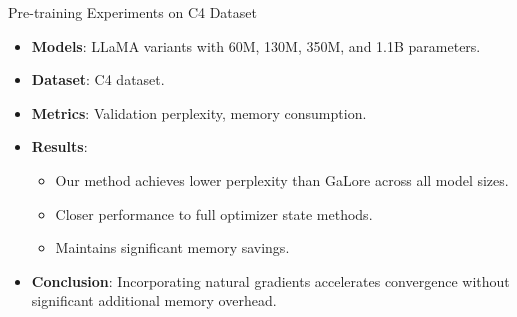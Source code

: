 \documentclass{beamer}
\begin{document}
\begin{frame}{Pre-training Experiments on C4 Dataset}
    \begin{itemize}
        \item \textbf{Models}: LLaMA variants with 60M, 130M, 350M, and 1.1B parameters.
        \item \textbf{Dataset}: C4 dataset.
        \item \textbf{Metrics}: Validation perplexity, memory consumption.
        \item \textbf{Results}:
            \begin{itemize}
                \item Our method achieves lower perplexity than GaLore across all model sizes.
                \item Closer performance to full optimizer state methods.
                \item Maintains significant memory savings.
            \end{itemize}
        \item \textbf{Conclusion}: Incorporating natural gradients accelerates convergence without significant additional memory overhead.
    \end{itemize}
\end{frame}
\end{document}
